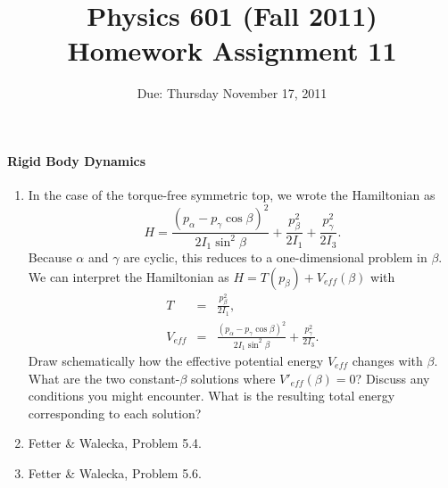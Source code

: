 \documentclass[letterpaper,11pt]{article}
\title{Physics 601 (Fall 2011) \\ Homework Assignment 11}
\date{Due: Thursday November 17, 2011}
\begin{document}
\maketitle

\paragraph*{Rigid Body Dynamics}
\begin{enumerate}
 \item In the case of the torque-free symmetric top, we wrote the Hamiltonian as
 \begin{equation*}
  H = \frac{(p_\alpha - p_\gamma\cos\beta)^2}{2 I_1 \sin^2\beta} + \frac{p^2_\beta}{2 I_1} + \frac{p^2_\gamma}{2 I_3}.
 \end{equation*}
 Because $\alpha$ and $\gamma$ are cyclic, this reduces to a one-dimensional problem in $\beta$.  We can interpret the Hamiltonian as $H = T(p_\beta) + V_{eff}(\beta)$ with
 \begin{eqnarray*}
  T & = & \frac{p^2_\beta}{2 I_1}, \\
  V_{eff} & = & \frac{(p_\alpha - p_\gamma\cos\beta)^2}{2 I_1 \sin^2\beta} + \frac{p^2_\gamma}{2 I_3}.
 \end{eqnarray*}
 Draw schematically how the effective potential energy $V_{eff}$ changes with $\beta$.  What are the two constant-$\beta$ solutions where $V'_{eff}(\beta) = 0$?  Discuss any conditions you might encounter.  What is the resulting total energy corresponding to each solution?
 \item Fetter \& Walecka, Problem 5.4.
 \item Fetter \& Walecka, Problem 5.6.
\end{enumerate}
\end{document}
